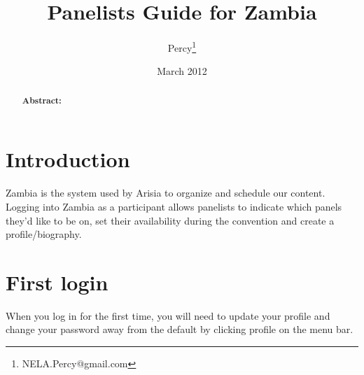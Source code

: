 \documentclass[captions=tablesignature]{scrartcl}
\author{Percy\thanks{NELA.Percy@gmail.com}}
\date{March 2012}
\title{Panelists Guide for Zambia}
\begin{document}
\maketitle
{}
\thispagestyle{fancy}
\renewcommand{\headrulewidth}{0pt}
\renewcommand{\footrulewidth}{0pt}
\lhead{}
\rhead{}
\chead{}
\lfoot{}
\cfoot{}
\rfoot{}
\begin{abstract}
\vspace{5cm}
{\LARGE{\textbf{Abstract:\\}}}

\end{abstract}
\newpage
\renewcommand{\headrulewidth}{1pt}
\renewcommand{\footrulewidth}{1pt}
\rfoot{\thepage}
\setcounter{tocdepth}{3}
\tableofcontents
\listoffigures
\listoftables
\newpage
{}
\section{Introduction}
\label{sec-1}
Zambia is the system used by Arisia to organize and schedule our
content.  Logging into Zambia as a participant allows panelists to
indicate which panels they’d like to be on, set their availability
during the convention and create a profile/biography.

\section{First login}
\label{sec-2}
When you log in for the first time, you will need to update your
profile and change your password away from the default by clicking
profile on the menu bar.
\end{document}
